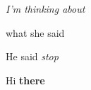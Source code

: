 \documentclass[11pt,a4paper]{article}
\begin{document}
\textit{I'm thinking about}

what she said

He said \textit{stop}

Hi \textbf{there}
\end{document}
